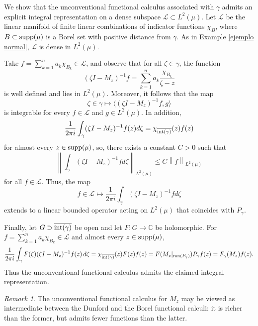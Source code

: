 \documentclass[11pt]{amsart}
\theoremstyle{definition}
\theoremstyle{remark}
\newtheorem{remark}[theorem]{Remark}
\numberwithin{equation}{section}
\newcommand{\norm}[1]{\left\|#1\right\|}
\newcommand{\ran}{\textnormal{ran}}
\newcommand{\supp}{\textnormal{supp}}
\newcommand{\pe}[1]{\langle#1\rangle}
\newcommand{\EL}{\mathcal{L}}
\newcommand{\C}{\mathbb{C}}
\newcommand{\inte}{\textnormal{int}}
\begin{document}
\smallskip

We show that the unconventional functional calculus associated with $\gamma$ admits an explicit integral representation on a dense subspace $\EL\subset L^2(\mu)$.
Let $\EL$ be the linear manifold of finite linear combinations of indicator functions $\chi_B$, where $B\subset\supp(\mu)$ is a Borel set with positive distance from $\gamma$.
As in Example \ref{ejemplo normal}, $\EL$ is dense in $L^2(\mu)$.

\smallskip


Take $f= \sum_{k=1}^n a_k \chi_{B_k}\in \EL$, and observe that for all $\zeta\in \gamma$, the function
$$(\zeta I-M_z)^{-1} f = \sum_{k=1}^n a_k \frac{\chi_{B_k}}{\zeta-z}$$
is well defined and lies in $L^2(\mu)$. Moreover, it follows that the map
$$\zeta \in \gamma \mapsto \pe{(\zeta I-M_z)^{-1} f,g}$$
is integrable for every  $f\in\EL$ and $g\in L^2(\mu)$. In addition,
$$
\frac{1}{2\pi i}\int_\gamma (\zeta I-M_z)^{-1} f(z) d\zeta = \chi_{\overline{\inte(\gamma)}}(z)f(z)
$$
for almost every $z\in \supp(\mu)$, so, there exists a constant $C>0$ such that
$$
\norm{\int_\gamma (\zeta I-M_z)^{-1}f d\zeta}_{L^2(\mu)} \leq C \norm{f}_{L^2(\mu)}
$$
for all $f\in\EL$. Thus, the map
$$f\in \EL \longmapsto \frac{1}{2\pi i}\int_\gamma (\zeta I-M_z)^{-1}f d\zeta$$
extends to a linear bounded operator acting on $L^2(\mu)$ that coincides with $P_\gamma$.

\medskip

Finally, let $G\supset\overline{\inte(\gamma)}$ be open and let $F:G\to\C$ be holomorphic.
For $f=\sum_{k=1}^n a_k\chi_{B_k}\in\EL$ and almost every $z\in\supp(\mu)$,
$$
\frac{1}{2\pi i}\int_\gamma F(\zeta)(\zeta I-M_z)^{-1}f(z)\,d\zeta
= \chi_{\overline{\inte(\gamma)}}(z)F(z)f(z)
= F(M_z|_{\ran(P_\gamma)})P_\gamma f(z)
= F_\gamma(M_z)f(z).
$$
Thus the unconventional functional calculus admits the claimed integral representation.

\medskip

\begin{remark}
The unconventional functional calculus for $M_z$ may be viewed as intermediate between the Dunford and the Borel functional calculi: it is richer than the former, but admits fewer functions than the latter.
\end{remark}
\end{document}
